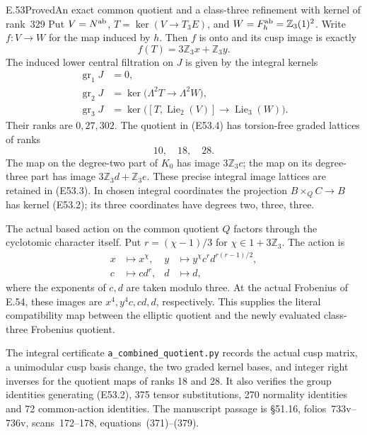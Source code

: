 \begin{statement}{E.53}{Proved}{An exact common quotient and a class-three refinement with kernel of rank~329}
Put $V=N^{\rm ab}$, $T=\ker(V\to T_3E)$, and
$W=F_h^{\rm ab}=\mathbb Z_3(1)^2$.
Write $f:V\to W$ for the map induced by $h$.
Then $f$ is onto and its cusp image is exactly
\[
                f(T)=3\mathbb Z_3x+\mathbb Z_3y.
 \tag{E53.5}
\]
The induced lower central filtration on $J$ is given
by the integral kernels
\[
 \begin{aligned}
 \operatorname{gr}_1J&=0,\\
 \operatorname{gr}_2J&=
       \ker\bigl(\Lambda^2T\longrightarrow\Lambda^2W\bigr),\\
 \operatorname{gr}_3J&=
       \ker\bigl([T,\operatorname{Lie}_2(V)]
                         \longrightarrow\operatorname{Lie}_3(W)\bigr).
 \end{aligned}
 \tag{E53.6}
\]
Their ranks are $0,27,302$. The quotient in (E53.4)
has torsion-free graded lattices of ranks
\[
                    10,\quad18,\quad28.
 \tag{E53.7}
\]
The map on the degree-two part of $K_0$ has image
$3\mathbb Z_3c$; the map on its degree-three part
has image $3\mathbb Z_3d+\mathbb Z_3e$. These precise
integral image lattices are retained in (E53.3).
In chosen integral coordinates the projection
$B\times_Q C\to B$ has kernel (E53.2);
its three coordinates have degrees two, three, three.

The actual based action on the common quotient $Q$
factors through the cyclotomic character itself.
Put $r=(\chi-1)/3$ for $\chi\in1+3\mathbb Z_3$.
The action is
\[
 \begin{aligned}
 x&\longmapsto x^\chi,&
 y&\longmapsto y^\chi c^r d^{r(r-1)/2},\\
 c&\longmapsto c d^r,&
 d&\longmapsto d,
 \end{aligned}
 \tag{E53.8}
\]
where the exponents of $c,d$ are taken modulo three.
At the actual Frobenius of E.54, these images are
$x^4,y^4c,cd,d$, respectively.
This supplies the literal compatibility map between
the elliptic quotient and the newly evaluated
class-three Frobenius quotient.

The integral certificate
\texttt{a\_combined\_quotient.py} records the actual
cusp matrix, a unimodular cusp basis change,
the two graded kernel bases, and integer right
inverses for the quotient maps of ranks 18 and 28.
It also verifies the group identities generating
(E53.2), 375 tensor substitutions, 270 normality
identities and 72 common-action identities.
The manuscript passage is \S51.16,
folios~733v--736v, scans~172--178, equations~(371)--(379).
\end{statement}

